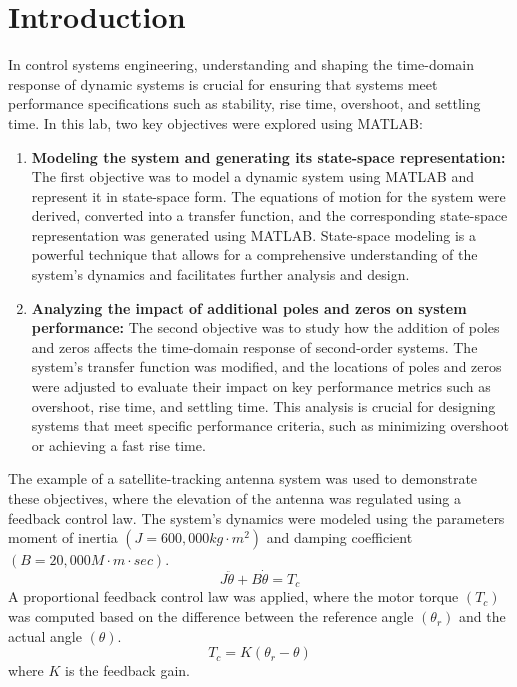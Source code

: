 \documentclass[a4paper, 12pt, english]{article}
\begin{document}

  \hypersetup{linkcolor=black}
  \tableofcontents

\newpage
\section{Introduction}
In control systems engineering, understanding and shaping the time-domain response of dynamic systems is crucial for ensuring that systems meet performance specifications such as stability, rise time, overshoot, and settling time. In this lab, two key objectives were explored using MATLAB:

\begin{enumerate}
    \item \textbf{Modeling the system and generating its state-space representation:} The first objective was to model a dynamic system using MATLAB and represent it in state-space form. The equations of motion for the system were derived, converted into a transfer function, and the corresponding state-space representation was generated using MATLAB. State-space modeling is a powerful technique that allows for a comprehensive understanding of the system’s dynamics and facilitates further analysis and design.

    \item \textbf{Analyzing the impact of additional poles and zeros on system performance:} The second objective was to study how the addition of poles and zeros affects the time-domain response of second-order systems. The system's transfer function was modified, and the locations of poles and zeros were adjusted to evaluate their impact on key performance metrics such as overshoot, rise time, and settling time. This analysis is crucial for designing systems that meet specific performance criteria, such as minimizing overshoot or achieving a fast rise time.
\end{enumerate}

The example of a satellite-tracking antenna system was used to demonstrate these objectives, where the elevation of the antenna was regulated using a feedback control law. The system’s dynamics were modeled using the parameters moment of inertia $\left( J = 600,000 kg\cdot{m}^{2}\right)$ and damping coefficient $\left( B = 20,000 M\cdot{m}\cdot{sec}\right)$.
\[J\ddot{\theta} + B\dot{\theta} = {T}_{c} \]
A proportional feedback control law was applied, where the motor torque $\left( {T}_{c} \right)$ was computed based on the difference between the reference angle $\left( {\theta}_{r} \right)$ and the actual angle $\left( \theta \right)$.
\[ {T}_{c} = K\left( {\theta}_{r} - {\theta} \right) \]
where $K$ is the feedback gain.
\end{document}
